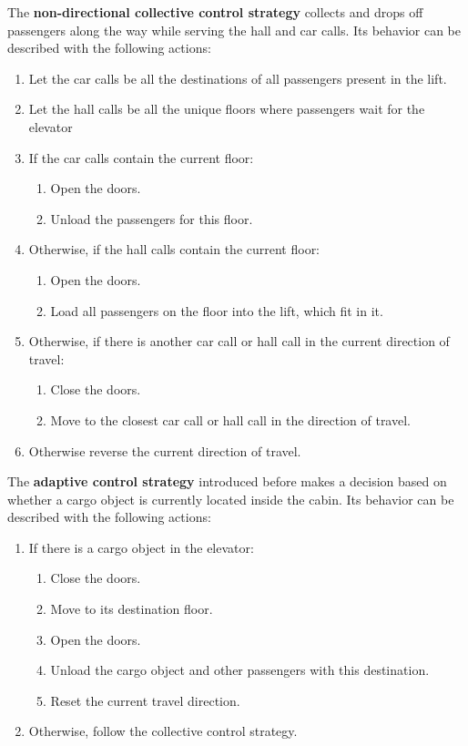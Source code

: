 The \textbf{non-directional collective control strategy} collects and drops off passengers along the way while serving the hall and car calls.
Its behavior can be described with the following actions:
\begin{enumerate}[noitemsep]
    \item Let the car calls be all the destinations of all passengers present in the lift.
    \item Let the hall calls be all the unique floors where passengers wait for the elevator
    \item If the car calls contain the current floor:
    \begin{enumerate}[noitemsep]
        \item Open the doors.
        \item Unload the passengers for this floor.
    \end{enumerate}
    \item Otherwise, if the hall calls contain the current floor:
    \begin{enumerate}[noitemsep]
        \item Open the doors.
        \item Load all passengers on the floor into the lift, which fit in it.
    \end{enumerate}
    \item Otherwise, if there is another car call or hall call in the current direction of travel:
    \begin{enumerate}[noitemsep]
        \item Close the doors.
        \item Move to the closest car call or hall call in the direction of travel.
    \end{enumerate}
    \item Otherwise reverse the current direction of travel.
\end{enumerate}

The \textbf{adaptive control strategy} introduced before makes a decision based on whether a cargo object is currently located inside the cabin.
Its behavior can be described with the following actions:
\begin{enumerate}[noitemsep]
    \item If there is a cargo object in the elevator:
    \begin{enumerate}[noitemsep]
        \item Close the doors.
        \item Move to its destination floor.
        \item Open the doors.
        \item Unload the cargo object and other passengers with this destination.
        \item Reset the current travel direction.
    \end{enumerate}
    \item Otherwise, follow the collective control strategy.
\end{enumerate}

